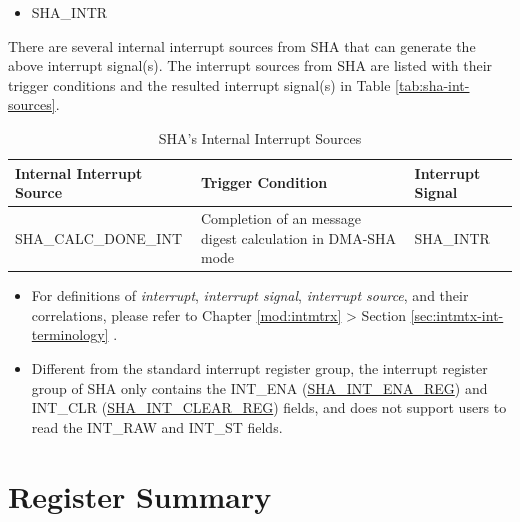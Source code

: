 \documentclass[main\_\_EN.tex]{subfiles}
\begin{document}
    \begin{itemize}
        \item SHA\_INTR
    \end{itemize}

There are several internal interrupt sources from SHA that can generate the above interrupt signal(s). The interrupt sources from SHA are listed with their trigger conditions and the resulted interrupt signal(s) in Table \ref{tab:sha-int-sources}.

\begin{longtable}{ | L{5cm} | L{6.5cm} | L{4cm} | }
\caption{SHA's Internal Interrupt Sources} \label{tab:sha-int-sources}
\\ \hline
{}
\textbf{Internal Interrupt Source} & \textbf{Trigger Condition}  &  \textbf{Interrupt Signal}\\ \hline
\label{int:SHACALCDONEINT}SHA\_CALC\_DONE\_INT  &  Completion of an message digest calculation in DMA-SHA mode &  SHA\_INTR  \\ \hline
\end{longtable}

\clearpage
\begin{tiplisting}
\begin{itemize}
    \item For definitions of \textit{interrupt}, \textit{interrupt signal}, \textit{interrupt source}, and their correlations, please refer to Chapter \ref{mod:intmtrx} \textit{} > Section \ref{sec:intmtx-int-terminology} \textit{}.
    \item Different from the standard interrupt register group, the interrupt register group of SHA only contains the INT\_ENA (\hyperref[regdesc:SHAINTENAREG]{SHA\_INT\_ENA\_REG}) and INT\_CLR (\hyperref[regdesc:SHAINTCLEARREG]{SHA\_INT\_CLEAR\_REG}) fields, and does not support users to read the INT\_RAW and INT\_ST fields.
\end{itemize}
\end{tiplisting}





\newpage
\hypertarget{sha-reg-summ}{}
\section{Register Summary}
\label{sec:sha-reg-summ}
\end{document}
